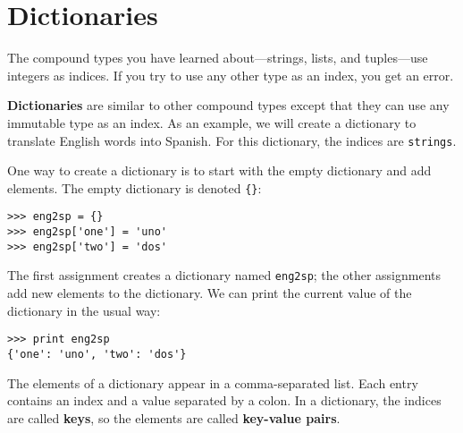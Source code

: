 


\chapter{Dictionaries}


The compound types you have learned about---strings, lists, and
tuples---use integers as indices.  If you try to use any other type as
an index, you get an error.

{\bf Dictionaries} are similar to other compound types except that
they can use any immutable type as an index.  As an example, we will
create a dictionary to translate English words into Spanish.  For this
dictionary, the indices are {\tt strings}.

One way to create a dictionary is to start with the empty dictionary
and add elements.  The empty dictionary is denoted {\verb+{}+}:

\beforeverb
\begin{verbatim}
>>> eng2sp = {}
>>> eng2sp['one'] = 'uno'
>>> eng2sp['two'] = 'dos'
\end{verbatim}
\afterverb
%
The first assignment creates a dictionary named {\tt eng2sp}; the
other assignments add new elements to the dictionary.  We can print
the current value of the dictionary in the usual way:

\beforeverb
\begin{verbatim}
>>> print eng2sp
{'one': 'uno', 'two': 'dos'}
\end{verbatim}
\afterverb
%
The elements of a dictionary appear in a comma-separated list.  Each
entry contains an index and a value separated by a colon.  In a
dictionary, the indices are called {\bf keys}, so the elements are
called {\bf key-value pairs}.

